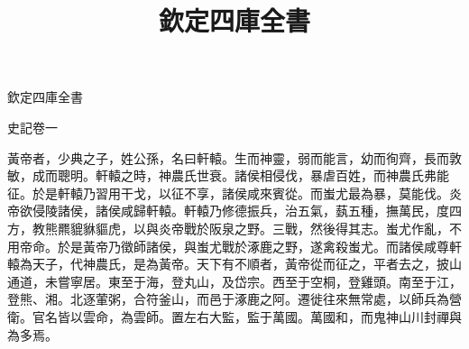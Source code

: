 \documentclass[四库全书]{ltc-guji}
\title{欽定四庫全書}
\begin{document}
\begin{正文}
欽定四庫全書

\begin{段落}[indent=1]
史記卷一
\end{段落}

黃帝者，少典之子，姓公孫，名曰軒轅。生而神靈，弱而能言，幼而徇齊，長而敦敏，成而聰明。軒轅之時，神農氏世衰。諸侯相侵伐，暴虐百姓，而神農氏弗能征。於是軒轅乃習用干戈，以征不享，諸侯咸來賓從。而蚩尤最為暴，莫能伐。炎帝欲侵陵諸侯，諸侯咸歸軒轅。軒轅乃修德振兵，治五氣，蓺五種，撫萬民，度四方，教熊羆貔貅貙虎，以與炎帝戰於阪泉之野。三戰，然後得其志。蚩尤作亂，不用帝命。於是黃帝乃徵師諸侯，與蚩尤戰於涿鹿之野，遂禽殺蚩尤。而諸侯咸尊軒轅為天子，代神農氏，是為黃帝。天下有不順者，黃帝從而征之，平者去之，披山通道，未嘗寧居。東至于海，登丸山，及岱宗。西至于空桐，登雞頭。南至于江，登熊、湘。北逐葷粥，合符釜山，而邑于涿鹿之阿。遷徙往來無常處，以師兵為營衛。官名皆以雲命，為雲師。置左右大監，監于萬國。萬國和，而鬼神山川封禪與為多焉。
\end{正文}
\end{document}
